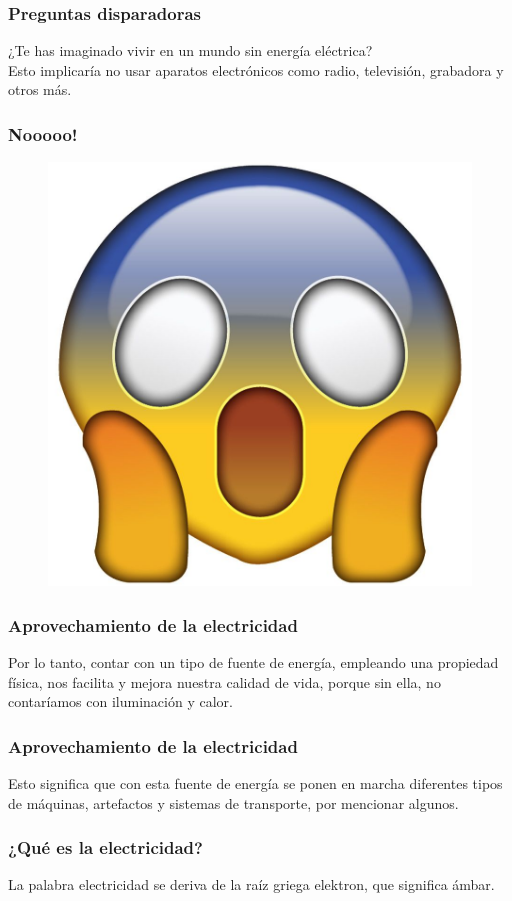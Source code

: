 \documentclass[14pt]{beamer}
\begin{document}
\begin{frame}
\frametitle{Preguntas disparadoras}
¿Te has imaginado vivir en un mundo sin energía eléctrica?
\\
\bigskip
\pause
Esto implicaría no usar aparatos electrónicos como radio, televisión, grabadora y otros más.
\end{frame}
\begin{frame}
\frametitle{Nooooo!}
\begin{figure}
    \centering
    \includegraphics[scale=0.1]{Imagenes/emoji_sorpresa.jpg}
\end{figure}
\end{frame}
\begin{frame}
\frametitle{Aprovechamiento de la electricidad}
Por lo tanto, \pause contar con un tipo de fuente de energía, empleando una propiedad física, \pause nos facilita y mejora nuestra calidad de vida, porque sin ella, no contaríamos con iluminación
y calor.
\end{frame}
\begin{frame}
\frametitle{Aprovechamiento de la electricidad}
Esto significa que con esta fuente de energía se ponen en marcha diferentes tipos de máquinas, artefactos y sistemas de transporte, por mencionar algunos.
\end{frame}
\begin{frame}
\frametitle{¿Qué es la electricidad?}
La palabra electricidad se deriva de la raíz griega elektron, que significa ámbar.
\end{frame}
\end{document}
